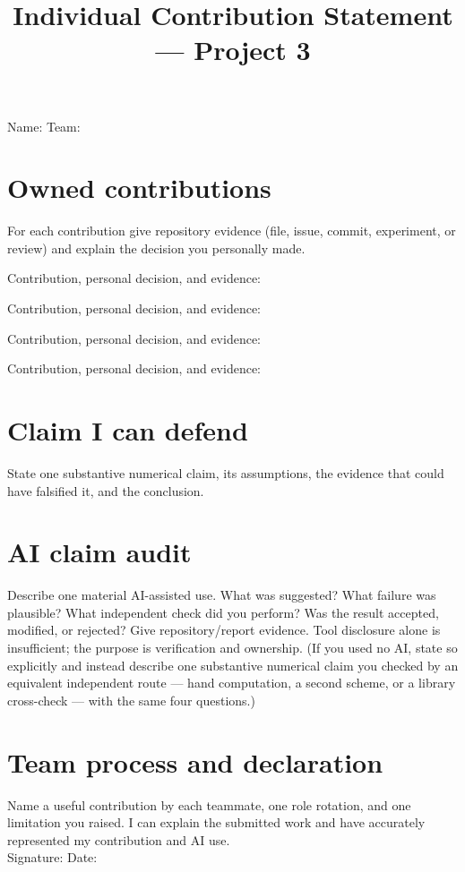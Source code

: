 \documentclass[11pt]{article}
\title{Individual Contribution Statement --- Project 3}\author{}\date{}
\begin{document}
\maketitle
Name: \hrulefill\quad Team: \hrulefill
\section*{Owned contributions}
For each contribution give repository evidence (file, issue, commit, experiment, or review) and explain the decision you personally made.
\begin{description}[leftmargin=3.4cm,style=nextline]
\item[Model and analysis] Contribution, personal decision, and evidence:\vspace{1.2cm}
\item[Implementation] Contribution, personal decision, and evidence:\vspace{1.2cm}
\item[Verification] Contribution, personal decision, and evidence:\vspace{1.2cm}
\item[Communication/review] Contribution, personal decision, and evidence:\vspace{1.2cm}
\end{description}
\section*{Claim I can defend}
State one substantive numerical claim, its assumptions, the evidence that could have falsified it, and the conclusion.
\vspace{4cm}
\clearpage
\section*{AI claim audit}
Describe one material AI-assisted use. What was suggested? What failure was plausible? What independent check did you perform? Was the result accepted, modified, or rejected? Give repository/report evidence. Tool disclosure alone is insufficient; the purpose is verification and ownership. (If you used no AI, state so explicitly and instead describe one substantive numerical claim you checked by an equivalent independent route --- hand computation, a second scheme, or a library cross-check --- with the same four questions.)
\vspace{6cm}
\section*{Team process and declaration}
Name a useful contribution by each teammate, one role rotation, and one limitation you raised. I can explain the submitted work and have accurately represented my contribution and AI use.\\[1.2cm]
Signature: \hrulefill\quad Date: \hrulefill
\end{document}
